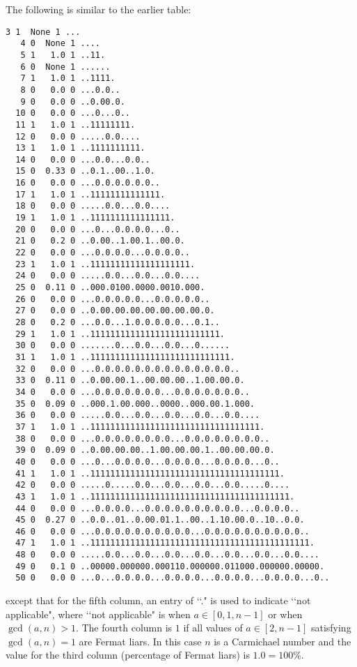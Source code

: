 The following is similar to the earlier table:
\begin{Verbatim}[frame=single,fontsize=\footnotesize]
   3 1  None 1 ...
   4 0  None 1 ....
   5 1   1.0 1 ..11.
   6 0  None 1 ......
   7 1   1.0 1 ..1111.
   8 0   0.0 0 ...0.0..
   9 0   0.0 0 ..0.00.0.
  10 0   0.0 0 ...0...0..
  11 1   1.0 1 ..11111111.
  12 0   0.0 0 .....0.0....
  13 1   1.0 1 ..1111111111.
  14 0   0.0 0 ...0.0...0.0..
  15 0  0.33 0 ..0.1..00..1.0.
  16 0   0.0 0 ...0.0.0.0.0.0..
  17 1   1.0 1 ..11111111111111.
  18 0   0.0 0 .....0.0...0.0....
  19 1   1.0 1 ..1111111111111111.
  20 0   0.0 0 ...0...0.0.0.0...0..
  21 0   0.2 0 ..0.00..1.00.1..00.0.
  22 0   0.0 0 ...0.0.0.0...0.0.0.0..
  23 1   1.0 1 ..11111111111111111111.
  24 0   0.0 0 .....0.0...0.0...0.0....
  25 0  0.11 0 ..000.0100.0000.0010.000.
  26 0   0.0 0 ...0.0.0.0.0...0.0.0.0.0..
  27 0   0.0 0 ..0.00.00.00.00.00.00.00.0.
  28 0   0.2 0 ...0.0...1.0.0.0.0.0...0.1..
  29 1   1.0 1 ..11111111111111111111111111.
  30 0   0.0 0 .......0...0.0...0.0...0......
  31 1   1.0 1 ..1111111111111111111111111111.
  32 0   0.0 0 ...0.0.0.0.0.0.0.0.0.0.0.0.0.0..
  33 0  0.11 0 ..0.00.00.1..00.00.00..1.00.00.0.
  34 0   0.0 0 ...0.0.0.0.0.0.0...0.0.0.0.0.0.0..
  35 0  0.09 0 ..000.1.00.000..0000..000.00.1.000.
  36 0   0.0 0 .....0.0...0.0...0.0...0.0...0.0....
  37 1   1.0 1 ..1111111111111111111111111111111111.
  38 0   0.0 0 ...0.0.0.0.0.0.0.0...0.0.0.0.0.0.0.0..
  39 0  0.09 0 ..0.00.00.00..1.00.00.00.1..00.00.00.0.
  40 0   0.0 0 ...0...0.0.0.0...0.0.0.0...0.0.0.0...0..
  41 1   1.0 1 ..11111111111111111111111111111111111111.
  42 0   0.0 0 .....0.....0.0...0.0...0.0...0.0.....0....
  43 1   1.0 1 ..1111111111111111111111111111111111111111.
  44 0   0.0 0 ...0.0.0.0...0.0.0.0.0.0.0.0.0.0...0.0.0.0..
  45 0  0.27 0 ..0.0..01..0.00.01.1..00..1.10.00.0..10..0.0.
  46 0   0.0 0 ...0.0.0.0.0.0.0.0.0.0...0.0.0.0.0.0.0.0.0.0..
  47 1   1.0 1 ..11111111111111111111111111111111111111111111.
  48 0   0.0 0 .....0.0...0.0...0.0...0.0...0.0...0.0...0.0....
  49 0   0.1 0 ..00000.000000.000110.000000.011000.000000.00000.
  50 0   0.0 0 ...0...0.0.0.0...0.0.0.0...0.0.0.0...0.0.0.0...0..
\end{Verbatim}
except that for the fifth column,
an entry of \lq\lq ." is used to indicate \lq\lq not applicable",
where \lq\lq not applicable" is when
$a \in [0,1,n-1]$ or when $\gcd(a, n) > 1$.
The fourth column is $1$ if all values of $a \in [2, n - 1]$
satisfying $\gcd(a, n) = 1$ are Fermat liars.
In this case $n$ is a Carmichael number
and the value for the third column (percentage of Fermat liars)
is $1.0 = 100\%$.

